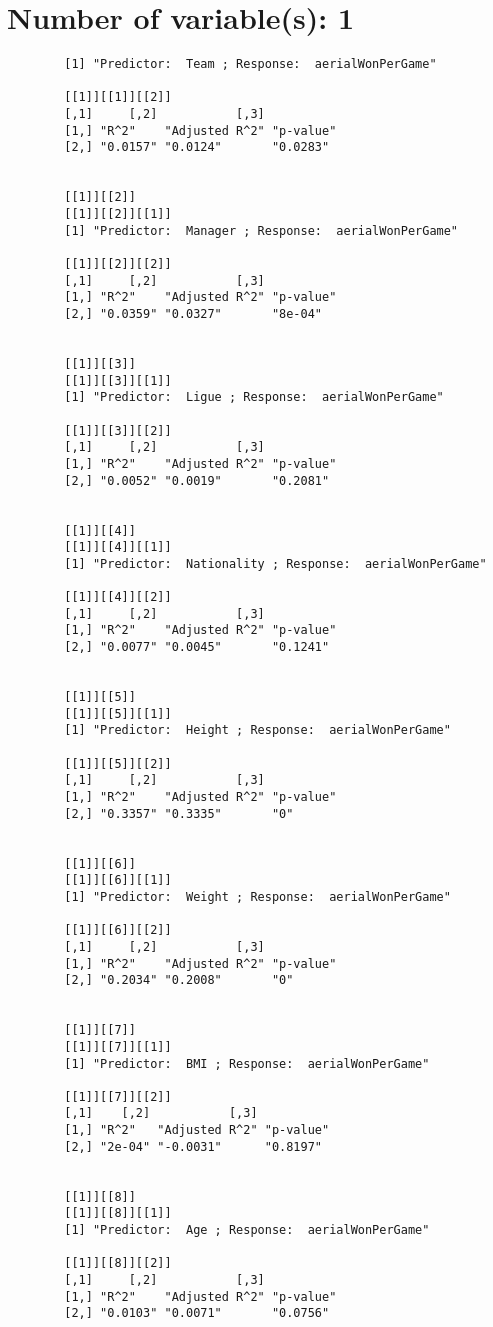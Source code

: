 \documentclass[12pt]{article}
\title{}
\author{}
\date{}
\begin{document}
	\section{Number of variable(s): 1}
	\begin{verbatim}
		[1] "Predictor:  Team ; Response:  aerialWonPerGame"
		
		[[1]][[1]][[2]]
		[,1]     [,2]           [,3]     
		[1,] "R^2"    "Adjusted R^2" "p-value"
		[2,] "0.0157" "0.0124"       "0.0283" 
		
		
		[[1]][[2]]
		[[1]][[2]][[1]]
		[1] "Predictor:  Manager ; Response:  aerialWonPerGame"
		
		[[1]][[2]][[2]]
		[,1]     [,2]           [,3]     
		[1,] "R^2"    "Adjusted R^2" "p-value"
		[2,] "0.0359" "0.0327"       "8e-04"  
		
		
		[[1]][[3]]
		[[1]][[3]][[1]]
		[1] "Predictor:  Ligue ; Response:  aerialWonPerGame"
		
		[[1]][[3]][[2]]
		[,1]     [,2]           [,3]     
		[1,] "R^2"    "Adjusted R^2" "p-value"
		[2,] "0.0052" "0.0019"       "0.2081" 
		
		
		[[1]][[4]]
		[[1]][[4]][[1]]
		[1] "Predictor:  Nationality ; Response:  aerialWonPerGame"
		
		[[1]][[4]][[2]]
		[,1]     [,2]           [,3]     
		[1,] "R^2"    "Adjusted R^2" "p-value"
		[2,] "0.0077" "0.0045"       "0.1241" 
		
		
		[[1]][[5]]
		[[1]][[5]][[1]]
		[1] "Predictor:  Height ; Response:  aerialWonPerGame"
		
		[[1]][[5]][[2]]
		[,1]     [,2]           [,3]     
		[1,] "R^2"    "Adjusted R^2" "p-value"
		[2,] "0.3357" "0.3335"       "0"      
		
		
		[[1]][[6]]
		[[1]][[6]][[1]]
		[1] "Predictor:  Weight ; Response:  aerialWonPerGame"
		
		[[1]][[6]][[2]]
		[,1]     [,2]           [,3]     
		[1,] "R^2"    "Adjusted R^2" "p-value"
		[2,] "0.2034" "0.2008"       "0"      
		
		
		[[1]][[7]]
		[[1]][[7]][[1]]
		[1] "Predictor:  BMI ; Response:  aerialWonPerGame"
		
		[[1]][[7]][[2]]
		[,1]    [,2]           [,3]     
		[1,] "R^2"   "Adjusted R^2" "p-value"
		[2,] "2e-04" "-0.0031"      "0.8197" 
		
		
		[[1]][[8]]
		[[1]][[8]][[1]]
		[1] "Predictor:  Age ; Response:  aerialWonPerGame"
		
		[[1]][[8]][[2]]
		[,1]     [,2]           [,3]     
		[1,] "R^2"    "Adjusted R^2" "p-value"
		[2,] "0.0103" "0.0071"       "0.0756" 
		

\end{verbatim}
\end{document}

